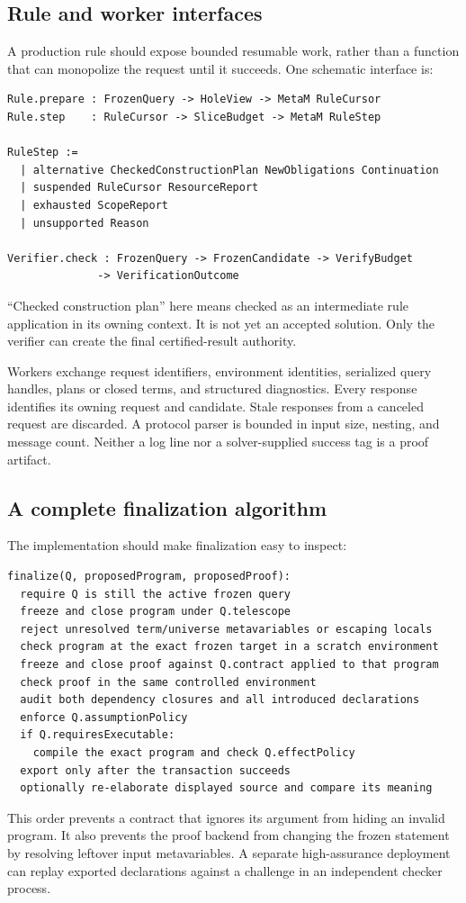 \subsection{Rule and worker interfaces}
A production rule should expose bounded resumable work, rather than a function that can monopolize the request until it succeeds. One schematic interface is:
\begin{lstlisting}
Rule.prepare : FrozenQuery -> HoleView -> MetaM RuleCursor
Rule.step    : RuleCursor -> SliceBudget -> MetaM RuleStep

RuleStep :=
  | alternative CheckedConstructionPlan NewObligations Continuation
  | suspended RuleCursor ResourceReport
  | exhausted ScopeReport
  | unsupported Reason

Verifier.check : FrozenQuery -> FrozenCandidate -> VerifyBudget
              -> VerificationOutcome
\end{lstlisting}
``Checked construction plan'' here means checked as an intermediate rule application in its owning context. It is not yet an accepted solution. Only the verifier can create the final certified-result authority.

Workers exchange request identifiers, environment identities, serialized query handles, plans or closed terms, and structured diagnostics. Every response identifies its owning request and candidate. Stale responses from a canceled request are discarded. A protocol parser is bounded in input size, nesting, and message count. Neither a log line nor a solver-supplied success tag is a proof artifact.

\subsection{A complete finalization algorithm}
The implementation should make finalization easy to inspect:
\begin{lstlisting}
finalize(Q, proposedProgram, proposedProof):
  require Q is still the active frozen query
  freeze and close program under Q.telescope
  reject unresolved term/universe metavariables or escaping locals
  check program at the exact frozen target in a scratch environment
  freeze and close proof against Q.contract applied to that program
  check proof in the same controlled environment
  audit both dependency closures and all introduced declarations
  enforce Q.assumptionPolicy
  if Q.requiresExecutable:
    compile the exact program and check Q.effectPolicy
  export only after the transaction succeeds
  optionally re-elaborate displayed source and compare its meaning
\end{lstlisting}
This order prevents a contract that ignores its argument from hiding an invalid program. It also prevents the proof backend from changing the frozen statement by resolving leftover input metavariables. A separate high-assurance deployment can replay exported declarations against a challenge in an independent checker process.

